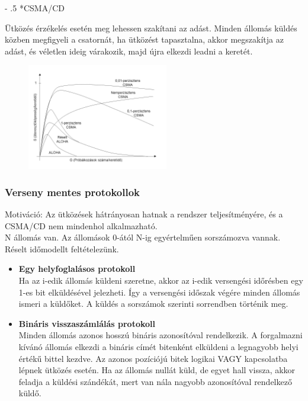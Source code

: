 \documentclass[12pt]{article}
\makeatletter
\renewcommand\paragraph{%
	\@startsection{paragraph}{4}{0mm}%
	{-\baselineskip}%
	{.5\baselineskip}%
	{\normalfont\normalsize\bfseries}}
\makeatother
\begin{document}
    \paragraph*{CSMA/CD}

    Ütközés érzékelés esetén meg lehessen szakítani az adást. Minden állomás küldés közben megfigyeli a csatornát, ha ütközést tapasztalna, akkor megszakítja az adást, és véletlen ideig várakozik, majd újra elkezdi leadni a keretét.

    \begin{figure}[H]
        	\centering
        	\includegraphics[width=0.55\textwidth]{img/aloha_csma.jpg}
        \end{figure}

    \subsubsection*{Verseny mentes protokollok}

    Motiváció: Az ütközések hátrányosan hatnak a rendszer teljesítményére, és a CSMA/CD nem mindenhol alkalmazható.\\

    \noindent N állomás van. Az állomások 0-ától N-ig egyértelműen sorszámozva vannak. Réselt időmodellt feltételezünk.
    \begin{itemize}[leftmargin=7.5mm]
        \renewcommand{\labelitemi}{$\vcenter{\hbox{\tiny$\bullet$}}$}
        \item \textbf{\small Egy helyfoglalásos protokoll} \\
        Ha az i-edik állomás küldeni szeretne, akkor az i-edik versengési időrésben egy 1-es bit elküldésével jelezheti. Így a versengési időszak végére minden állomás ismeri a küldőket. A küldés a sorszámok szerinti sorrendben történik meg.
        \item \textbf{\small Bináris visszaszámlálás protokoll} \\
        Minden állomás azonos hosszú bináris azonosítóval rendelkezik. A forgalmazni kívánó állomás elkezdi a bináris címét bitenként elküldeni a legnagyobb helyi értékű bittel kezdve. Az azonos pozíciójú bitek logikai VAGY kapcsolatba lépnek ütközés esetén. Ha az állomás nullát küld, de egyet hall vissza, akkor feladja a küldési szándékát, mert van nála nagyobb azonosítóval rendelkező küldő.
    \end{itemize}
\end{document}
